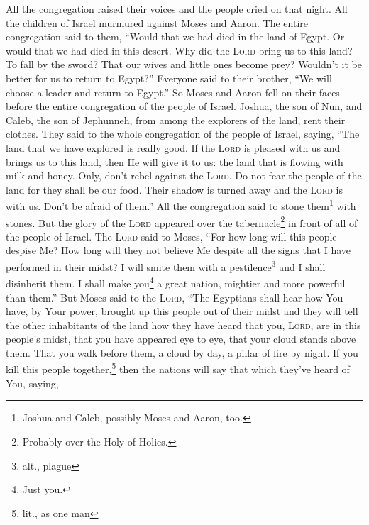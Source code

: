 
\begin{enumerate*}[mode=unboxed]
     All the congregation raised their voices and the people cried on that night.%
     All the children of Israel murmured against Moses and Aaron. The entire congregation said to them, ``Would that we had died in the land of Egypt. Or would that we had died in this desert.%
     Why did the \textsc{Lord} bring us to this land? To fall by the sword? That our wives and little ones become prey? Wouldn't it be better for us to return to Egypt?''%
     Everyone said to their brother, ``We will choose a leader and return to Egypt.''%
     So Moses and Aaron fell on their faces before the entire congregation of the people of Israel.%
     Joshua, the son of Nun, and Caleb, the son of Jephunneh, from among the explorers of the land, rent their clothes.%
     They said to the whole congregation of the people of Israel, saying, ``The land that we have explored is really good.%
     If the \textsc{Lord} is pleased with us and brings us to this land, then He will give it to us: the land that is flowing with milk and honey.%
     Only, don't rebel against the \textsc{Lord}. Do not fear the people of the land for they shall be our food. Their shadow is turned away and the \textsc{Lord} is with us. Don't be afraid of them.''%
     All the congregation said to stone them\footnote{Joshua and Caleb, possibly Moses and Aaron, too.} with stones. But the glory of the \textsc{Lord} appeared over the tabernacle\footnote{Probably over the Holy of Holies.} in front of all of the people of Israel.%
     The \textsc{Lord} said to Moses, ``For how long will this people despise Me? How long will they not believe Me despite all the signs that I have performed in their midst?%
     I will smite them with a pestilence\footnote{alt., plague} and I shall disinherit them. I shall make you\footnote{Just you.} a great nation, mightier and more powerful than them.''%
     But Moses said to the \textsc{Lord}, ``The Egyptians shall hear how You have, by Your power, brought up this people out of their midst%
     and they will tell the other inhabitants of the land how they have heard that you, \textsc{Lord}, are in this people's midst, that you have appeared eye to eye, that your cloud stands above them. That you walk before them, a cloud by day, a pillar of fire by night.%
     If you kill this people together,\footnote{lit., as one man} then the nations will say that which they've heard of You, saying,%

\end{enumerate*}
